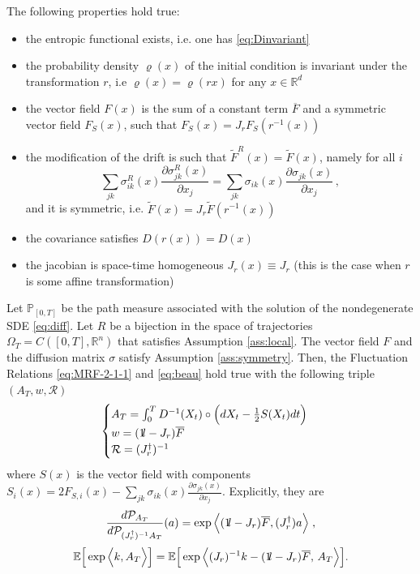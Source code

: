 \documentclass[10pt,a4paper]{amsart}
\newcommand{\bbbone}{\mathchoice {\rm 1\mskip-4mu l} {\rm 1\mskip-4mu l}
{\rm 1\mskip-4.5mu l} {\rm 1\mskip-5mu l}}
\begin{document}
\begin{assumption}\label{ass:symmetry} The following properties hold true:
\begin{itemize}
    \item[(i)] the entropic functional exists, i.e. one has \eqref{eq:Dinvariant} 
    \item[(ii)] the probability density $\varrho(x)$ of the initial condition is invariant under the transformation $r$, i.e $\varrho(x)=\varrho(rx)$ for any $x \in \mathbb{R}^d$
    \item[(iii)] the vector field $F(x)$ is the sum of a constant term $\overline{F}$ and a symmetric vector field $F_S(x)$, such that $F_S(x)= J_r F_S (r^{-1}(x))$
    \item[(iv)] the modification of the drift is such that $\widetilde{F}^R(x)=\widetilde{F}(x)$, namely for all $i$ 
    $$ \sum_{jk}\sigma^R_{ik}(x)\frac{\partial \sigma^R_{jk}(x)}{\partial x_j} = \sum_{jk}\sigma_{ik}(x)\frac{\partial \sigma_{jk}(x)}{\partial x_j}\,,$$
    and it is symmetric, i.e. $\widetilde{F}(x)= J_r \widetilde{F}(r^{-1}(x))$
    \item[(v)]  the covariance satisfies $D(r(x))= D(x)$
    \item[(vi)] the jacobian is space-time homogeneous $J_r(x) \equiv J_r$ (this is the case when $r$ is some affine transformation)
\end{itemize}
\end{assumption}

\begin{theorem}
Let $\mathbb{P}_{\left[0,T\right]}$ be the path measure associated with the solution of the nondegenerate SDE \eqref{eq:diff}. Let $R$ be a bijection in the space of trajectories $\Omega_T=C([0,T], \mathbb{R}^n)$ that satisfies Assumption \ref{ass:local}. The vector field $F$ and the diffusion matrix $\sigma$ satisfy Assumption \ref{ass:symmetry}. Then, the Fluctuation Relations \eqref{eq:MRF-2-1-1} and \eqref{eq:beau} hold true with the following triple $(A_T, w, \mathcal{R})$
    $$\begin{cases}
     A_T=\int_{0}^{T}  D^{-1}(X_{t})\circ \Big(dX_{t} - \frac{1}{2} S(X_t) dt \Big) \\
     w = (\bbbone -J_r) \overline{F} \\
     \mathcal{R} = (J_r^\dag)^{-1}
    \end{cases}$$
where $S(x)$ is the vector field with components $ S_i(x)= 2 F_{S,i}(x) - \sum_{jk}\sigma_{ik}(x)\frac{\partial \sigma_{jk}(x)}{\partial x_j}$. Explicitly, they are
\begin{equation}\label{eq:diffFR1}
\frac{d\mathcal{P}_{A_T}}{d\mathcal{P}_{(J_r^\dag)^{-1} A_T}}(a)=\exp \Big\langle (\bbbone -J_r)\overline{F},(J_r^\dag) a \Big\rangle  \; ,
\end{equation}
\begin{equation}\label{eq:diffFR2}
\mathbb{E}\Big[\exp\Big\langle k,A_T\Big\rangle \Big]=\mathbb{E}\Big[\exp \Big\langle (J_r)^{-1} k -
(\bbbone-J_r)\overline{F}, \,A_T\Big\rangle \Big] .
\end{equation}
\end{theorem}
\end{document}
